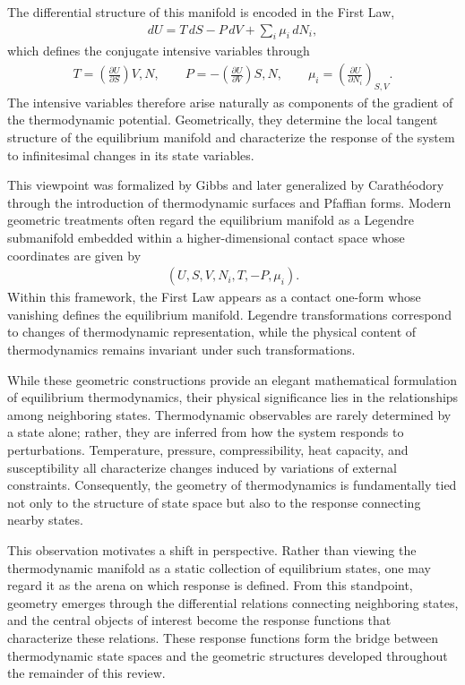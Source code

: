 The differential structure of this manifold is encoded in the First Law,
\begin{align}
dU = T\,dS - P\,dV + \sum_i \mu_i\, dN_i,
\end{align}
which defines the conjugate intensive variables through
\begin{align}
T=\left(\frac{\partial U}{\partial S}\right){V,N},
\qquad
P=-\left(\frac{\partial U}{\partial V}\right){S,N},
\qquad
\mu_i=\left(\frac{\partial U}{\partial N_i}\right)_{S,V}.
\end{align}
The intensive variables therefore arise naturally as components of the gradient of the thermodynamic potential. Geometrically, they determine the local tangent structure of the equilibrium manifold and characterize the response of the system to infinitesimal changes in its state variables.

This viewpoint was formalized by Gibbs and later generalized by Carathéodory through the introduction of thermodynamic surfaces and Pfaffian forms. Modern geometric treatments often regard the equilibrium manifold as a Legendre submanifold embedded within a higher-dimensional contact space whose coordinates are given by
\begin{align}
(U,S,V,N_i,T,-P,\mu_i).
\end{align}
Within this framework, the First Law appears as a contact one-form whose vanishing defines the equilibrium manifold. Legendre transformations correspond to changes of thermodynamic representation, while the physical content of thermodynamics remains invariant under such transformations.

While these geometric constructions provide an elegant mathematical formulation of equilibrium thermodynamics, their physical significance lies in the relationships among neighboring states. Thermodynamic observables are rarely determined by a state alone; rather, they are inferred from how the system responds to perturbations. Temperature, pressure, compressibility, heat capacity, and susceptibility all characterize changes induced by variations of external constraints. Consequently, the geometry of thermodynamics is fundamentally tied not only to the structure of state space but also to the response connecting nearby states.

This observation motivates a shift in perspective. Rather than viewing the thermodynamic manifold as a static collection of equilibrium states, one may regard it as the arena on which response is defined. From this standpoint, geometry emerges through the differential relations connecting neighboring states, and the central objects of interest become the response functions that characterize these relations. These response functions form the bridge between thermodynamic state spaces and the geometric structures developed throughout the remainder of this review.


